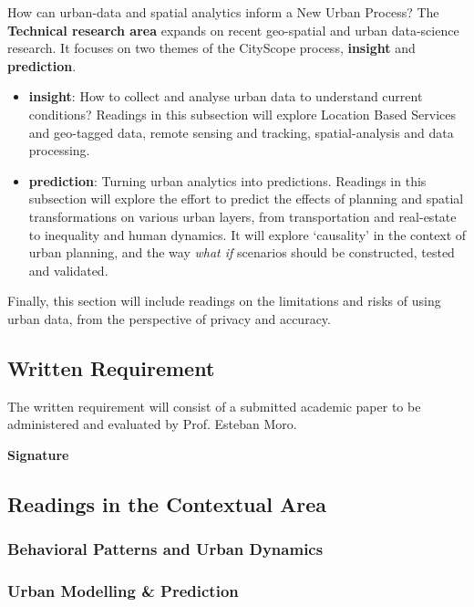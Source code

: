 How can urban-data and spatial analytics inform a New Urban Process? The \textbf{Technical research area} expands on recent geo-spatial and urban data-science research. It focuses on two themes of the CityScope process, \textbf{insight} and \textbf{prediction}.
\begin{itemize}
    \item \textbf{insight}: How to collect and analyse urban data to understand current conditions?
    Readings in this subsection will explore Location Based Services and geo-tagged data, remote sensing and tracking, spatial-analysis and data processing.
    \item \textbf{prediction}: Turning urban analytics into predictions. Readings in this subsection will explore the effort to predict the effects of planning and spatial transformations on various urban layers, from transportation and real-estate to inequality and human dynamics.
    It will explore `causality' in the context of urban planning, and the way \textit{what if} scenarios should be constructed, tested and validated.


    
\end{itemize}
Finally, this section will include readings on the limitations and risks of using urban data, from the perspective of privacy and accuracy. 

% 
\subsection*{Written Requirement}
The written requirement will consist of a submitted academic paper to be administered and evaluated by Prof. Esteban Moro.\par
% 
\textbf{Signature}\hspace{0.5cm} \makebox[2in]{\hrulefill}

\newpage
\subsection*{Readings in the Contextual Area}
\subsubsection*{Behavioral Patterns and Urban Dynamics}
\begin{bibunit}[unsrt]
\nocite{*}
\end{bibunit}
\subsubsection*{Urban Modelling \& Prediction}
\begin{bibunit}[unsrt]
\nocite{*}
\end{bibunit}
